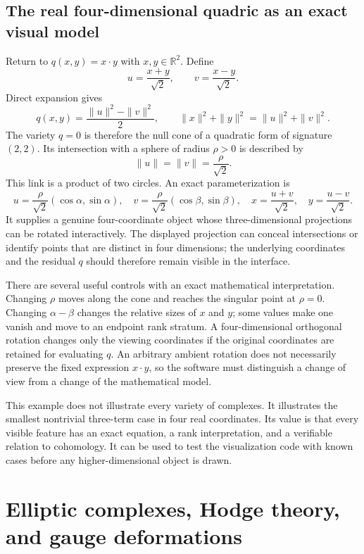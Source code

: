 \section{The real four-dimensional quadric as an exact visual model}

Return to $q(x,y)=x\cdot y$ with $x,y\in\mathbb R^2$. Define
\[
u=\frac{x+y}{\sqrt2},\qquad
v=\frac{x-y}{\sqrt2}.
\]
Direct expansion gives
\[
q(x,y)=\frac{\|u\|^2-\|v\|^2}{2},
\qquad
\|x\|^2+\|y\|^2=\|u\|^2+\|v\|^2.
\]
The variety $q=0$ is therefore the null cone of a quadratic form of signature $(2,2)$. Its intersection with a sphere of radius $\rho>0$ is described by
\[
\|u\|=\|v\|=\frac{\rho}{\sqrt2}.
\]
This link is a product of two circles. An exact parameterization is
\[
u=\frac{\rho}{\sqrt2}(\cos\alpha,\sin\alpha),
\quad
v=\frac{\rho}{\sqrt2}(\cos\beta,\sin\beta),
\quad
x=\frac{u+v}{\sqrt2},\quad y=\frac{u-v}{\sqrt2}.
\]
It supplies a genuine four-coordinate object whose three-dimensional projections can be rotated interactively. The displayed projection can conceal intersections or identify points that are distinct in four dimensions; the underlying coordinates and the residual $q$ should therefore remain visible in the interface.

There are several useful controls with an exact mathematical interpretation. Changing $\rho$ moves along the cone and reaches the singular point at $\rho=0$. Changing $\alpha-\beta$ changes the relative sizes of $x$ and $y$; some values make one vanish and move to an endpoint rank stratum. A four-dimensional orthogonal rotation changes only the viewing coordinates if the original coordinates are retained for evaluating $q$. An arbitrary ambient rotation does not necessarily preserve the fixed expression $x\cdot y$, so the software must distinguish a change of view from a change of the mathematical model.

This example does not illustrate every variety of complexes. It illustrates the smallest nontrivial three-term case in four real coordinates. Its value is that every visible feature has an exact equation, a rank interpretation, and a verifiable relation to cohomology. It can be used to test the visualization code with known cases before any higher-dimensional object is drawn.

\chapter{Elliptic complexes, Hodge theory, and gauge deformations}
\label{ch:elliptic-complexes}

